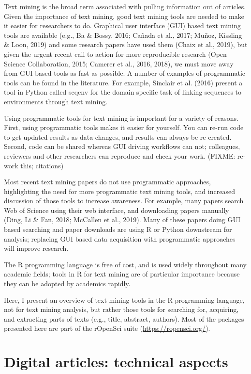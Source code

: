 \documentclass[author-year, review, 11pt]{components/elsarticle} %
\begin{document}
Text mining is the broad term associated with pulling information out of
articles. Given the importance of text mining, good text mining tools
are needed to make it easier for researchers to do. Graphical user
interface (GUI) based text mining tools are available (e.g., Ba \&
Bossy, 2016; Cañada et al., 2017; Muñoz, Kissling \& Loon, 2019) and
some research papers have used them (Chaix et al., 2019), but given the
urgent recent call to action for more reproducible research (Open
Science Collaboration, 2015; Camerer et al., 2016, 2018), we must move
away from GUI based tools as fast as possible. A number of examples of
programmatic tools can be found in the literature. For example, Sinclair
et al. (2016) present a tool in Python called seqenv for the domain
specific task of linking sequences to environments through text mining.

Using programmatic tools for text mining is important for a variety of
reasons. First, using programmatic tools makes it easier for yourself.
You can re-run code to get updated results as data changes, and results
can always be re-created. Second, code can be shared whereas GUI driving
workflows can not; colleagues, reviewers and other researchers can
reproduce and check your work. (FIXME: re-work this; citations)

Most recent text mining papers do not use programmatic approaches,
highlighting the need for more programmatic text mining tools, and
increased discussion of those tools to increase awareness. For example,
many papers search Web of Science using their web interface, and
downloading papers manually (Ding, Li \& Fan, 2018; McCallen et al.,
2019). Many of these papers doing GUI based searching and paper
downloads are using R or Python downstream for analysis; replacing GUI
based data acquisition with programmatic approaches will improve
research.

The R programming language is free of cost, and is used widely
throughout many academic fields; tools in R for text mining are of
particular importance because they can be adopted by academics rapidly.

Here, I present an overview of text mining tools in the R programming
language, not for text mining analysis, but rather those tools for
searching for, acquiring, and extracting parts of texts (e.g., title,
abstract, authors). Most of the packages presented here are part of the
rOpenSci suite (\url{https://ropensci.org/}).

\hypertarget{digital-articles-technical-aspects}{%
\section{Digital articles: technical
aspects}\label{digital-articles-technical-aspects}}
\end{document}
